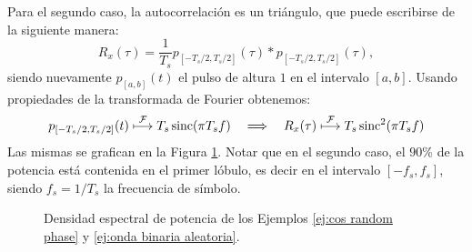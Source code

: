 Para el segundo caso, la autocorrelación es un triángulo, que puede escribirse de la siguiente manera:
\begin{equation*}
    R_x(\tau) = \frac{1}{T_s} p_{[-T_s/2,T_s/2]} (\tau) * p_{[-T_s/2,T_s/2]} (\tau),
\end{equation*}
siendo nuevamente $p_{[a,b]}(t)$ el pulso de altura $1$ en el intervalo $[a,b]$. Usando propiedades de la transformada de Fourier obtenemos:
\begin{equation*}
    p_{[-T_s/2,T_s/2]}(t) \;\displaystyle{\mathop{\longmapsto}^{\mathcal{F}}}\; T_s \operatorname{sinc}(\pi T_s f) \quad \Longrightarrow \quad R_x(\tau) \;\displaystyle{\mathop{\longmapsto}^{\mathcal{F}}}\; T_s \operatorname{sinc}^2(\pi T_s f)
\end{equation*}
Las mismas se grafican en la Figura \ref{fig:ejemplo dep continua}. Notar que en el segundo caso, el $90\%$ de la potencia está contenida en el primer lóbulo, es decir en el intervalo $[-f_s,f_s]$, siendo $f_s=1/T_s$ la frecuencia de símbolo.

\begin{figure}
    \begin{center}
        \hspace{1cm}
    \end{center}
    \caption{Densidad espectral de potencia de los Ejemplos \ref{ej:cos random phase} y \ref{ej:onda binaria aleatoria}.}\label{fig:ejemplo dep continua}
\end{figure}

